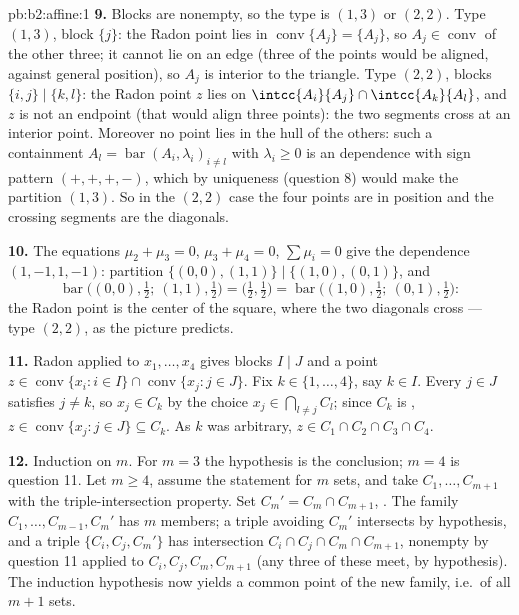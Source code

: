 \begin{solution}{pb:b2:affine:1}
\textbf{9.} Blocks are nonempty, so the type is $(1,3)$ or
$(2,2)$. Type $(1,3)$, block $\{j\}$: the Radon point lies in
$\operatorname{conv}\{A_j\} = \{A_j\}$, so $A_j \in
\operatorname{conv}$ of the other three; it cannot lie on an
edge (three of the points would be aligned, against general
position), so $A_j$ is interior to the triangle. Type
$(2,2)$, blocks $\{i,j\} \mid \{k,l\}$: the Radon point $z$
lies on $\intcc{A_i}{A_j} \cap \intcc{A_k}{A_l}$, and $z$ is
not an endpoint (that would align three points): the two
segments cross at an interior point. Moreover no point lies
in the hull of the others: such a containment $A_l =
\operatorname{bar}(A_i, \lambda_i)_{i \neq l}$ with
$\lambda_i \geq 0$ is an  dependence with sign pattern
$(+,+,+,-)$, which by uniqueness (question 8) would make the
partition $(1,3)$. So in the $(2,2)$ case the four points are
in  position and the crossing segments are the
diagonals.

\textbf{10.} The equations $\mu_2 + \mu_3 = 0$, $\mu_3 +
\mu_4 = 0$, $\sum\mu_i = 0$ give the dependence $(1, -1, 1,
-1)$: partition $\{(0,0), (1,1)\} \mid \{(1,0), (0,1)\}$, and
\[
\operatorname{bar}\bigl((0,0), \tfrac12;\ (1,1),
\tfrac12\bigr) = \bigl(\tfrac12, \tfrac12\bigr) =
\operatorname{bar}\bigl((1,0), \tfrac12;\ (0,1),
\tfrac12\bigr) :
\]
the Radon point is the center of the square, where the two
diagonals cross --- type $(2,2)$, as the picture predicts.

\textbf{11.} Radon applied to $x_1, \dots, x_4$ gives blocks
$I \mid J$ and a point $z \in \operatorname{conv}\{x_i : i
\in I\} \cap \operatorname{conv}\{x_j : j \in J\}$. Fix $k
\in \{1, \dots, 4\}$, say $k \in I$. Every $j \in J$
satisfies $j \neq k$, so $x_j \in C_k$ by the choice $x_j \in
\bigcap_{l \neq j}C_l$; since $C_k$ is , $z \in
\operatorname{conv}\{x_j : j \in J\} \subseteq C_k$. As $k$
was arbitrary, $z \in C_1 \cap C_2 \cap C_3 \cap C_4$.

\textbf{12.} Induction on $m$. For $m = 3$ the hypothesis is
the conclusion; $m = 4$ is question 11. Let $m \geq 4$,
assume the statement for $m$ sets, and take $C_1, \dots,
C_{m+1}$ with the triple-intersection property. Set $C_m' =
C_m \cap C_{m+1}$, . The family $C_1, \dots, C_{m-1},
C_m'$ has $m$ members; a triple avoiding $C_m'$ intersects by
hypothesis, and a triple $\{C_i, C_j, C_m'\}$ has
intersection $C_i \cap C_j \cap C_m \cap C_{m+1}$, nonempty
by question 11 applied to $C_i, C_j, C_m, C_{m+1}$ (any three
of these meet, by hypothesis). The induction hypothesis now
yields a common point of the new family, i.e.\ of all $m+1$
sets.


\end{solution}
